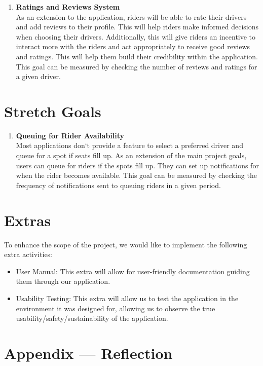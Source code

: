 \documentclass{article}
\begin{document}
\begin{enumerate}
\item \textbf{Ratings and Reviews System} \\
As an extension to the application, riders will be able to rate their drivers and add reviews to their profile. This will help riders make informed decisions when choosing their drivers. Additionally, this will give riders an incentive to interact more with the riders and act appropriately to receive good reviews and ratings. This will help them build their credibility within the application. This goal can be measured by checking the number of reviews and ratings for a given driver. 
\end{enumerate}

\section{Stretch Goals}
\begin{enumerate}
\item \textbf{Queuing for Rider Availability}\\
Most applications don`t provide a feature to select a preferred driver and queue for a spot if seats fill up. As an extension of the main project goals, users can queue for riders if the spots fill up. They can set up notifications for when the rider becomes available. This goal can be measured by checking the frequency of notifications sent to queuing riders in a given period. 
\end{enumerate}

\section{Extras} 

To enhance the scope of the project, we would like to implement the following extra
activities:
\begin{itemize}
\item User Manual: This extra will allow for user-friendly documentation guiding them 
through our application.
\item Usability Testing: This extra will allow us to test the application in the environment
it was designed for, allowing us to observe the true usability/safety/sustainability of the application.
\end{itemize}


\newpage{}

\section*{Appendix --- Reflection}
\end{document}

